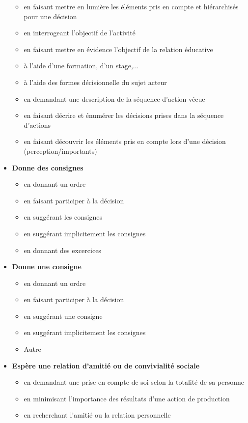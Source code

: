 \documentclass[8pt,a4paper]{article}
\begin{document}
\begin{itemize}
\begin{itemize}
\item en faisant mettre en lumière les éléments pris en compte et hiérarchisés pour une décision 
\item en interrogeant l'objectif de l'activité
\item en faisant mettre en évidence l'objectif de la relation éducative
\item à l'aide d'une formation, d'un stage,...
\item à l'aide des formes décisionnelle du sujet acteur
\item en demandant une description de la séquence d'action vécue
\item en faisant décrire et énumérer les décisions prises dans la séquence d'actions
\item en faisant découvrir les éléments pris en compte lors d'une décision (perception/importants)
\\ 
 \end{itemize}
\item \textbf{Donne des consignes}
\begin{itemize}
\item en donnant un ordre
\item en faisant participer à la décision
\item en suggérant les consignes
\item en suggérant implicitement les consignes
\item en donnant des excercices
\\ 
 \end{itemize}
\item \textbf{Donne une consigne}
\begin{itemize}
\item en donnant un ordre
\item en faisant participer à la décision
\item en suggérant une consigne
\item en suggérant implicitement les consignes
\item Autre
\\ 
 \end{itemize}
\item \textbf{Espère une relation d'amitié ou de convivialité sociale}
\begin{itemize}
\item en demandant une prise en compte de soi selon la totalité de sa personne
\item en minimisant l'importance des résultats d'une action de production
\item en recherchant l'amitié ou la relation personnelle

\end{itemize}
\end{itemize}
\end{document}
